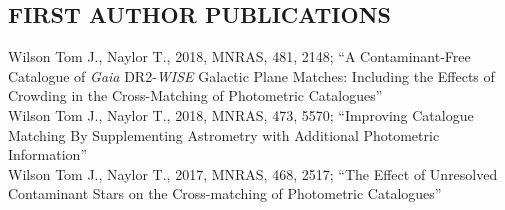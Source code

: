 \documentclass[letter, margin, 10pt]{res} %
\begin{document}
\begin{resume}
\parskip 5pt
\vspace{-2pt}
\section{FIRST AUTHOR PUBLICATIONS}

Wilson Tom J., Naylor T., 2018, MNRAS, 481, 2148; ``A Contaminant-Free Catalogue of \textit{Gaia} DR2-\textit{WISE} Galactic Plane Matches: Including the Effects of Crowding in the Cross-Matching of Photometric Catalogues''\vspace{2pt}\\
Wilson Tom J., Naylor T., 2018, MNRAS, 473, 5570; ``Improving Catalogue Matching By Supplementing Astrometry with Additional Photometric Information''\vspace{2pt}\\
Wilson Tom J., Naylor T., 2017, MNRAS, 468, 2517; ``The Effect of Unresolved Contaminant Stars on the Cross-matching of Photometric Catalogues''
\vspace{-5pt}

\end{resume}
\end{document}
